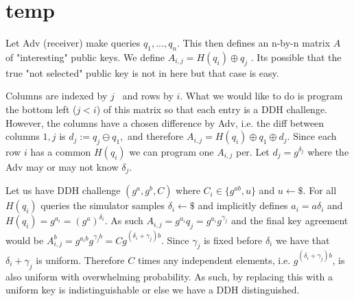 \pagebreak
\section{temp}

Let Adv (receiver) make queries $q_1,...,q_n$. This then defines an n-by-n matrix $A$ of "interesting" public keys. We define $A_{i,j}=H(q_i)\oplus q_j$ . Its possible that the true "not selected" public key is not in here but that case is easy.

Columns are indexed by $j$  and rows by $i$. What we would like to do is program the bottom left ($j<i$) of this matrix so that each entry is a DDH challenge. However, the columns have a chosen difference by Adv, i.e. the diff between columns $1,j$ is $d_j:=q_{j}\ominus q_{1}$, and therefore $A_{i,j}=H(q_i)\oplus q_1\oplus d_j$. Since each row $i$ has a common $H(q_i)$ we can program one $A_{i,j}$ per. Let $d_j=g^{\delta_j}$ where the Adv may or may not know $\delta_j$.

Let us have DDH challenge $(g^a,g^b,C)$ where $C_i\in \{g^{ab}, u\}$ and $u\gets \$$. For all $H(q_i)$ queries the simulator samples $\delta_i\gets \$$ and implicitly defines $a_i=a\delta_i$ and $H(q_i)=g^{a_i}=(g^a)^{\delta_i}$. As such $A_{i,j}=g^{a_i}q_j =g^{a_i} g^{\gamma_j}$ and the final key agreement would be $A^b_{i,j}=g^{a_ib} g^{\gamma_jb}=Cg^{(\delta_i+\gamma_j)b}$. Since $\gamma_j$ is fixed before $\delta_i$ we have that $\delta_i+\gamma_j$ is uniform. Therefore $C$ times any independent elements, i.e. $g^{(\delta_i+\gamma_j)b}$, is also uniform with overwhelming probability. As such, by replacing this with a uniform key is indistinguishable or else we have a DDH distinguished.

